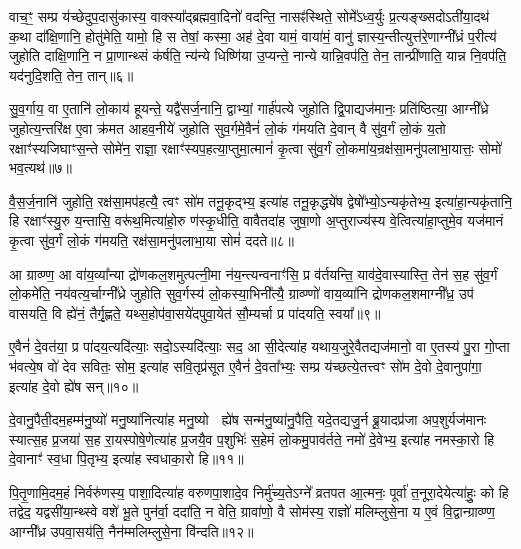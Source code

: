 वाच॒ꣳ॒ सम्प्र य॑च्छेदुप॒दासु॑कास्य॒ वाक्स्या᳚द्ब्रह्मवा॒दिनो॑ वदन्ति॒ नासꣴ॑स्थिते॒ सोमे᳚\-ऽध्व॒र्युः प्र॒त्यङ्ख्सदो\-ऽती॑या॒दथ॑ क॒था दा᳚क्षि॒णानि॒ होतु॑मेति॒ यामो॒ हि स तेषां॒ कस्मा॒ अह॑ दे॒वा यामं॒ वाया॑मं॒ वानु॑ ज्ञास्य॒न्तीत्युत्त॑रे॒णाग्नी᳚ध्रं प॒रीत्य॑ जुहोति दाक्षि॒णानि॒ न प्रा॒णान्थ्सं क॑र्\mbox{}षति॒ न्य॑न्ये धिष्णि॑या उ॒प्यन्ते॒ नान्ये यान्नि॒वप॑ति॒ तेन॒ तान्प्री॑णाति॒ यान्न नि॒वप॑ति॒ यद॑नुदि॒शति॒ तेन॒ तान्॥६॥

{\anuvakamend[{स्तु॒ते वि॒न्दते॒ हि वी॑यन्ते प्र॒तीची॑रुद्गा॒त्र उ॒प्यन्ते॒ चतु॑र्दश च॥१॥}]}

सु॒व॒र्गाय॒ वा ए॒तानि॑ लो॒काय॑ हूयन्ते॒ यद्वै॑सर्ज॒नानि॒ द्वाभ्यां॒ गार्\mbox{}ह॑पत्ये जुहोति द्वि॒पाद्यज॑मानः॒ प्रति॑ष्ठित्या॒ आग्नी᳚ध्रे जुहोत्य॒न्तरि॑क्ष ए॒वा क्र॑मत आहव॒नीये॑ जुहोति सुव॒र्गमे॒वैनं॑ लो॒कं ग॑मयति दे॒वान् वै सु॑व॒र्गं लो॒कं य॒तो रक्षाꣳ॑स्यजिघाꣳस॒न्ते सोमे॑न॒ राज्ञा॒ रक्षाꣳ॑स्यप॒हत्या॒प्तुमा॒त्मानं॑ कृ॒त्वा सु॑व॒र्गं लो॒कमा॑य॒न्रक्ष॑सा॒मनु॑पलाभा॒यात्तः॒ सोमो॑ भव॒त्यथ॑॥७॥

वै॒स॒र्ज॒नानि॑ जुहोति॒ रक्ष॑सा॒मप॑हत्यै॒ त्वꣳ सो॑म तनू॒कृद्भ्य॒ इत्या॑ह तनू॒कृद्ध्ये॑ष द्वेषो᳚भ्यो॒\-ऽन्यकृ॑तेभ्य॒ इत्या॑हा॒न्यकृ॑तानि॒ हि रक्षाꣳ॑स्यु॒रु य॒न्तासि॒ वरू॑थ॒मित्या॑हो॒रु ण॑स्कृ॒धीति॒ वावैतदा॑ह जुषा॒णो अ॒प्तुराज्य॑स्य वे॒त्वित्या॑हा॒प्तुमे॒व यज॑मानं कृ॒त्वा सु॑व॒र्गं लो॒कं ग॑मयति॒ रक्ष॑सा॒मनु॑पलाभा॒या सोमं॑ ददते॥८॥

आ ग्राव्ण्ण॒ आ वा॑य॒व्या᳚न्या द्रो॑णकल॒शमुत्पत्नी॒मा न॑य॒न्त्यन्वनाꣳ॑सि॒ प्र व॑र्तयन्ति॒ याव॑दे॒वास्यास्ति॒ तेन॑ स॒ह सु॑व॒र्गं लो॒कमे॑ति॒ नय॑वत्य॒र्चाग्नी᳚ध्रे जुहोति सुव॒र्गस्य॑ लो॒कस्या॒भिनी᳚त्यै॒ ग्राव्ण्णो॑ वाय॒व्या॑नि द्रोणकल॒शमाग्नी᳚ध्र॒ उप॑ वासयति॒ वि ह्ये॑नं॒ तैर्गृ॒ह्णते॒ यथ्स॒होप॑वा॒सये॑दपुवा॒येत॑ सौ॒म्यर्चा प्र पा॑दयति॒ स्वया᳚॥९॥

ए॒वैनं॑ दे॒वत॑या॒ प्र पा॑दय॒त्यदि॑त्याः॒ सदो॒\-ऽस्यदि॑त्याः॒ सद॒ आ सी॒देत्या॑ह यथाय॒जुरे॒वैतद्यज॑मानो॒ वा ए॒तस्य॑ पु॒रा गो॒प्ता भ॑वत्ये॒ष वो॑ देव सवितः॒ सोम॒ इत्या॑ह सवि॒तृप्र॑सूत ए॒वैनं॑ दे॒वता᳚भ्यः॒ सम्प्र य॑च्छत्ये॒तत्त्वꣳ सो॑म दे॒वो दे॒वानुपा॑गा॒ इत्या॑ह दे॒वो ह्ये॑ष सन्॥१०॥

दे॒वानु॒पैती॒दम॒हम्म॑नु॒ष्यो॑ मनु॒ष्या॑नित्या॑ह मनु॒ष्यो  ह्ये॑ष सन्म॑नु॒ष्या॑नु॒पैति॒ यदे॒तद्यजु॒र्न ब्रू॒यादप्र॑जा अप॒शुर्यज॑मानः स्यात्स॒ह प्र॒जया॑ स॒ह रा॒यस्पोषे॒णेत्या॑ह प्र॒जयै॒व प॒शुभिः॑ स॒हेमं लो॒कमु॒पाव॑र्तते॒ नमो॑ दे॒वेभ्य॒ इत्या॑ह नमस्का॒रो हि दे॒वानाꣳ॑ स्व॒धा पि॒तृभ्य॒ इत्या॑ह स्वधाका॒रो हि॥११॥

पि॒तृ॒णामि॒दम॒हं निर्वरु॑णस्य॒ पाशा॒दित्या॑ह वरुणपा॒शादे॒व निर्मु॑च्य॒ते\-ऽग्ने᳚ व्रतपत आ॒त्मनः॒ पूर्वा॑ त॒नूरा॒देयेत्या॑हुः॒ को हि तद्वेद॒ यद्वसी॑या॒न्थ्स्वे वशे॑ भू॒ते पुन॑र्वा॒ ददा॑ति॒ न वेति॒ ग्रावा॑णो॒ वै सोम॑स्य॒ राज्ञो॑ मलिम्लुसे॒ना य ए॒वं वि॒द्वान्ग्राव्ण्ण॒ आग्नी᳚ध्र उपवा॒सय॑ति॒ नैन॑म्मलिम्लुसे॒ना वि॑न्दति॥१२॥

